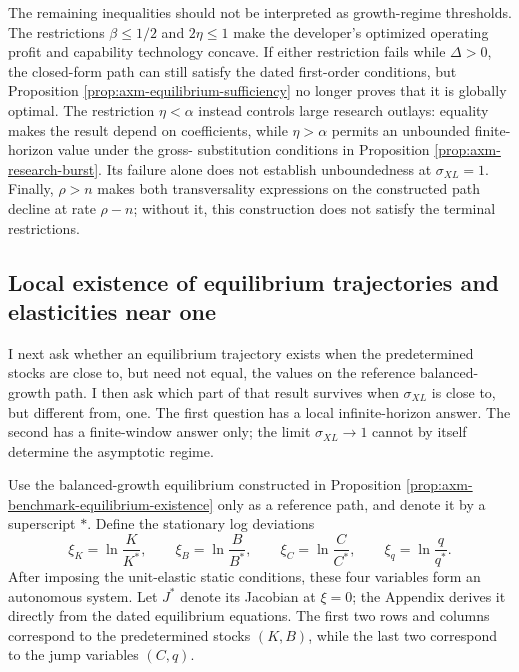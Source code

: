 The remaining inequalities should not be interpreted as growth-regime
thresholds. The restrictions \(\beta\leq1/2\) and \(2\eta\leq1\) make the
developer's optimized operating profit and capability technology concave. If
either restriction fails while \(\Delta>0\), the closed-form path can still
satisfy the dated first-order conditions, but Proposition
\ref{prop:axm-equilibrium-sufficiency} no longer proves that it is globally
optimal. The restriction \(\eta<\alpha\) instead controls large research
outlays: equality makes the result depend on coefficients, while
\(\eta>\alpha\) permits an unbounded finite-horizon value under the gross-
substitution conditions in Proposition \ref{prop:axm-research-burst}. Its
failure alone does not establish unboundedness at \(\sigma_{XL}=1\). Finally,
\(\rho>n\) makes both transversality expressions on the constructed path
decline at rate \(\rho-n\); without it, this construction does not satisfy the
terminal restrictions.

\subsection{Local existence of equilibrium trajectories and elasticities near one}

I next ask whether an equilibrium trajectory exists when the predetermined
stocks are close to, but need not equal, the values on the reference
balanced-growth path. I then ask which part of that result survives when
\(\sigma_{XL}\) is close to, but different from, one. The first question has a
local infinite-horizon answer. The second has a finite-window answer only; the
limit \(\sigma_{XL}\to1\) cannot by itself determine the asymptotic regime.

Use the balanced-growth equilibrium constructed in Proposition
\ref{prop:axm-benchmark-equilibrium-existence} only as a reference path, and
denote it by a superscript \(*\). Define the stationary log deviations
\begin{equation}
 \xi_K=\ln\frac{K}{K^*},\qquad
 \xi_B=\ln\frac{B}{B^*},\qquad
 \xi_C=\ln\frac{C}{C^*},\qquad
 \xi_q=\ln\frac{q}{q^*}.
 \label{eq:axm-benchmark-log-deviations}
\end{equation}
After imposing the unit-elastic static conditions, these four variables form an
autonomous system. Let \(J^*\) denote its Jacobian at \(\xi=0\); the Appendix
derives it directly from the dated equilibrium equations. The first two rows
and columns correspond to the predetermined stocks \((K,B)\), while the last
two correspond to the jump variables \((C,q)\).

